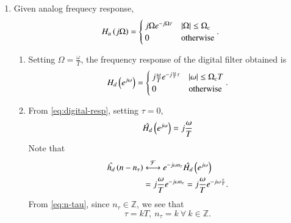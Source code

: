 \documentclass[journal,12pt,twocolumn]{IEEEtran}
\begin{document}
\begin{enumerate}[label=\theenumi.]
    \item Given analog frequecy response,
    \begin{equation}
        H_a\left(j\Omega\right) =
        \begin{cases}
            j\Omega{}e^{-j\Omega\tau} & \left\vert\Omega\right\vert \le \Omega_c \\
            0 & \text{otherwise}
        \end{cases}.
        \label{eq:analog-resp}
    \end{equation}
    \begin{enumerate}
        \item Setting \(\Omega = \frac{\omega}{T}\), the frequency response
        of the digital filter obtained is
        \begin{equation}
            H_d\left(e^{j\omega}\right) = 
            \begin{cases}
                j\frac{\omega}{T}e^{-j\frac{\omega}{T}\tau} & \left\vert\omega\right\vert \le \Omega_cT \\
                0 & \text{otherwise}
            \end{cases}.
            \label{eq:digital-resp}
        \end{equation}

        \item From \eqref{eq:digital-resp}, setting \(\tau = 0\),
        \begin{equation}
            \hat{H_d}\left(e^{j\omega}\right) = j\frac{\omega}{T}
            \label{eq:digital-resp-zero}
        \end{equation}
        Note that
        \begin{align}
            \hat{h_d}\left(n-n_{\tau}\right) &\overset{\mathcal{F}}{ \longleftrightarrow} e^{-j\omega{}n_{\tau}}\hat{H_d}\left(e^{j\omega}\right) \\
            &= j\frac{\omega}{T}e^{-j\omega{}n_{\tau}} =  j\frac{\omega}{T}e^{-j\omega\frac{\tau}{T}}.
            \label{eq:n-tau}
        \end{align}
        From \eqref{eq:n-tau}, since \(n_{\tau} \in \mathbb{Z}\), we see 
        that
        \begin{equation}
            \tau = kT,\ n_{\tau} = k\ \forall\ k \in \mathbb{Z}.
            \label{eq:sol-set}
        \end{equation}
    \end{enumerate}


\end{enumerate}
\end{document}
